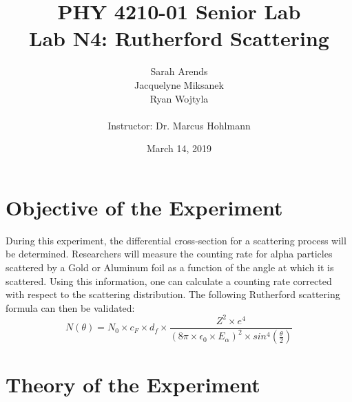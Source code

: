 \documentclass[a4paper]{article}
\title{PHY 4210-01 Senior Lab \\Lab N4: Rutherford Scattering}
\author{Sarah Arends \\
        Jacquelyne Miksanek \\
        Ryan Wojtyla \\ \\
        Instructor: Dr. Marcus Hohlmann}
\date{March 14, 2019}
\begin{document}
\maketitle

\begin{abstract}
  \qq
\end{abstract}

\newpage

\tableofcontents

\newpage

\section{Objective of the Experiment}
\qq During this experiment, the differential cross-section for a scattering
process will be determined. Researchers will measure the counting rate for alpha
particles scattered by a Gold or Aluminum foil as a function of the angle at
which it is scattered. Using this information, one can calculate a counting rate
corrected with respect to the scattering distribution. The following Rutherford
scattering formula can then be validated:
\begin{equation}
N(\theta) = N_0 \times c_F \times d_f \times
            \frac {Z^2 \times e^4}
                  {
                  \left( 8\pi \times \epsilon_0\times E_{\alpha} \right) ^2
                   \times  sin^4 \left( \frac{\theta}{2} \right)
                  }
\end{equation}

\section{Theory of the Experiment}
\end{document}
